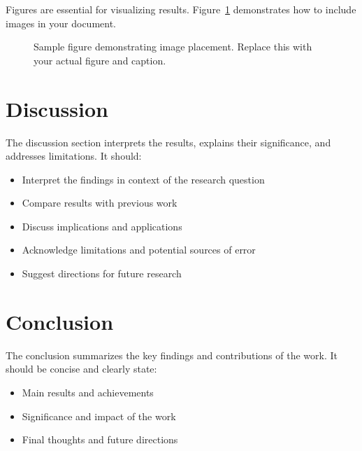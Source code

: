 \documentclass[12pt,a4paper]{article}
\begin{document}
Figures are essential for visualizing results. Figure~\ref{fig:sample} demonstrates how to include images in your document.

\begin{figure}[ht]
\centering
\caption{Sample figure demonstrating image placement. Replace this with your actual figure and caption.}
\label{fig:sample}
\end{figure}

\section{Discussion}
\label{sec:discussion}

The discussion section interprets the results, explains their significance, and addresses limitations. It should:

\begin{itemize}
    \item Interpret the findings in context of the research question
    \item Compare results with previous work
    \item Discuss implications and applications
    \item Acknowledge limitations and potential sources of error
    \item Suggest directions for future research
\end{itemize}

\section{Conclusion}
\label{sec:conclusion}

The conclusion summarizes the key findings and contributions of the work. It should be concise and clearly state:

\begin{itemize}
    \item Main results and achievements
    \item Significance and impact of the work
    \item Final thoughts and future directions
\end{itemize}
\end{document}
